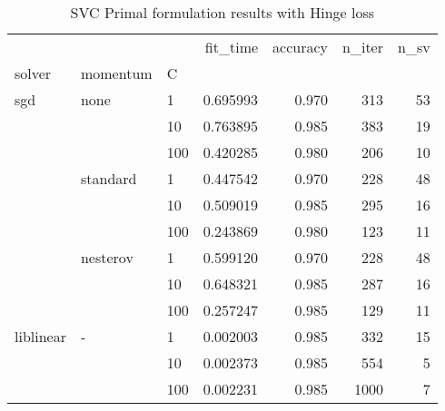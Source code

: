 \begin{table}[H]
\centering
\caption{SVC Primal formulation results with Hinge loss}
\label{primal_svc_hinge_cv_results}
\begin{tabular}{lllrrrr}
\toprule
          &   &     &  fit\_time &  accuracy &  n\_iter &  n\_sv \\
solver & momentum & C &           &           &         &       \\
\midrule
sgd & none & 1   &  0.695993 &     0.970 &     313 &    53 \\
          &   & 10  &  0.763895 &     0.985 &     383 &    19 \\
          &   & 100 &  0.420285 &     0.980 &     206 &    10 \\
          & standard & 1   &  0.447542 &     0.970 &     228 &    48 \\
          &   & 10  &  0.509019 &     0.985 &     295 &    16 \\
          &   & 100 &  0.243869 &     0.980 &     123 &    11 \\
          & nesterov & 1   &  0.599120 &     0.970 &     228 &    48 \\
          &   & 10  &  0.648321 &     0.985 &     287 &    16 \\
          &   & 100 &  0.257247 &     0.985 &     129 &    11 \\
liblinear & - & 1   &  0.002003 &     0.985 &     332 &    15 \\
          &   & 10  &  0.002373 &     0.985 &     554 &     5 \\
          &   & 100 &  0.002231 &     0.985 &    1000 &     7 \\
\bottomrule
\end{tabular}
\end{table}
